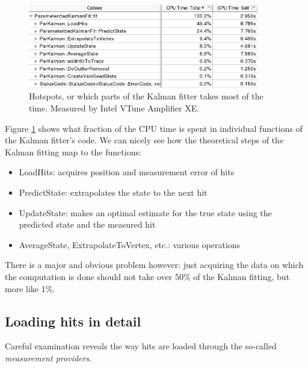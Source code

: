 \documentclass[12pt]{article}
\begin{document}
\begin{figure}[H]
	\begin{center}
		\includegraphics[width=0.9\textwidth]{kalmanfit_overall_breakdown}
	\end{center}
	\caption[CPU hotspots in the Kalman fitter]{Hotspots, or which parts of the Kalman fitter takes most of the time. Measured by Intel VTune Amplifier XE.}
	\label{fig_kalman_vtune_initial}
\end{figure}

Figure \ref{fig_kalman_vtune_initial} shows what fraction of the CPU time is spent in individual functions of the Kalman fitter's code. We can nicely see how the theoretical steps of the Kalman fitting map to the functions:
\begin{itemize}
	\item LoadHits: acquires position and measurement error of hits
	\item PredictState: extrapolates the state to the next hit
	\item UpdateState: makes an optimal estimate for the true state using the predicted state and the measured hit
	\item AverageState, ExtrapolateToVertex, etc.: various operations
\end{itemize}
There is a major and obvious problem however: just acquiring the data on which the computation is done should not take over 50\% of the Kalman fitting, but more like 1\%.	


\subsection{Loading hits in detail}

Careful examination reveals the way hits are loaded through the so-called \textit{measurement providers}.
	
\end{document}
